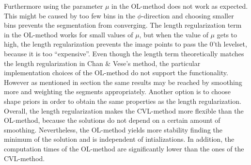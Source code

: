 Furthermore using the parameter $\mu$ in the OL-method does not work as expected. This might be caused by too few bins in the $\phi$-direction and choosing smaller bins prevents the segmentation from converging. The length regularization term in the OL-method works for small values of $\mu$, but when the value of $\mu$ gets to high, the length regularization prevents the image points to pass the 0'th levelset, because it is too ``expensive''. Even though the length term theoretically matches the length regularization in Chan \& Vese's method, the particular implementation choices of the OL-method do not support the functionality.\\
However as mentioned in section  the same results may be reached by smoothing more and weighting the segments appropriately. Another option is to choose shape priors in order to obtain the same properties as the length regularization.\\

Overall, the length regularization makes the CVL-method more flexible than the OL-method, because the solutions do not depend on a certain amount of smoothing. Nevertheless, the OL-method yields more stability finding the minimum of the solution and is independent of intializations. In addition, the computation times of the OL-method are significantly lower than the ones of the CVL-method.